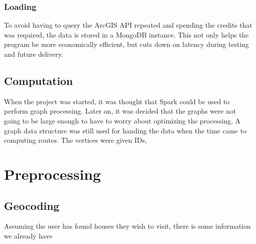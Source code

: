\documentclass[11 pt]{article}
\theoremstyle{definition}
\theoremstyle{definition}
\begin{document}
\subsubsection{Loading}
To avoid having to query the ArcGIS API repeated and spending the credits that was required\cite{ArcGIS}, the data is stored in a MongoDB instance. This not only helps the program be more economically efficient, but cuts down on latency during testing and future delivery.

\subsection{Computation}

When the project was started, it was thought that Spark could be used to perform graph processing\cite{SPARK}. Later on, it was decided that the graphs were not going to be large enough to have to worry about optimizing the processing. A graph data structure was still used for handing the data when the time came to computing routes\cite{Agarwal}. The vertices were given IDs, 

\section{Preprocessing}

\subsection{Geocoding} \label{geocoding}
Assuming the user has found houses they wish to visit, there is some information we already have

\end{document}
